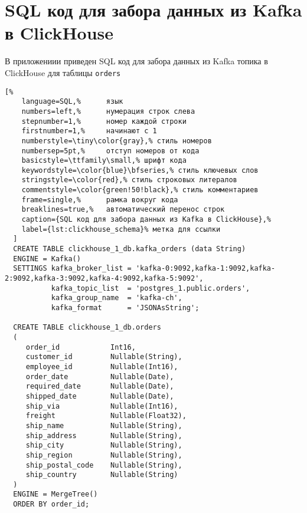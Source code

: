 \chapter{SQL код для забора данных из Kafka в ClickHouse}\label{ex_1_sql}							%

В приложениии приведен SQL код для забора данных из Kafka топика в ClickHouse для таблицы \texttt{orders}

\begin{lstlisting}[%
	language=SQL,%      язык
	numbers=left,%      нумерация строк слева
	stepnumber=1,%      номер каждой строки
	firstnumber=1,%     начинают с 1
	numberstyle=\tiny\color{gray},% стиль номеров
	numbersep=5pt,%     отступ номеров от кода
	basicstyle=\ttfamily\small,% шрифт кода
	keywordstyle=\color{blue}\bfseries,% стиль ключевых слов
	stringstyle=\color{red},% стиль строковых литералов
	commentstyle=\color{green!50!black},% стиль комментариев
	frame=single,%      рамка вокруг кода
	breaklines=true,%   автоматический перенос строк
	caption={SQL код для забора данных из Kafka в ClickHouse},%
	label={lst:clickhouse_schema}% метка для ссылки
  ]
  CREATE TABLE clickhouse_1_db.kafka_orders (data String)
  ENGINE = Kafka()
  SETTINGS kafka_broker_list = 'kafka-0:9092,kafka-1:9092,kafka-2:9092,kafka-3:9092,kafka-4:9092,kafka-5:9092',
		   kafka_topic_list  = 'postgres_1.public.orders',
		   kafka_group_name  = 'kafka-ch',
		   kafka_format      = 'JSONAsString';
  
  CREATE TABLE clickhouse_1_db.orders
  (
	 order_id            Int16,
	 customer_id         Nullable(String),
	 employee_id         Nullable(Int16),
	 order_date          Nullable(Date),
	 required_date       Nullable(Date),
	 shipped_date        Nullable(Date),
	 ship_via            Nullable(Int16),
	 freight             Nullable(Float32),
	 ship_name           Nullable(String),
	 ship_address        Nullable(String),
	 ship_city           Nullable(String),
	 ship_region         Nullable(String),
	 ship_postal_code    Nullable(String),
	 ship_country        Nullable(String)
  )
  ENGINE = MergeTree()
  ORDER BY order_id;
  

\end{lstlisting}
